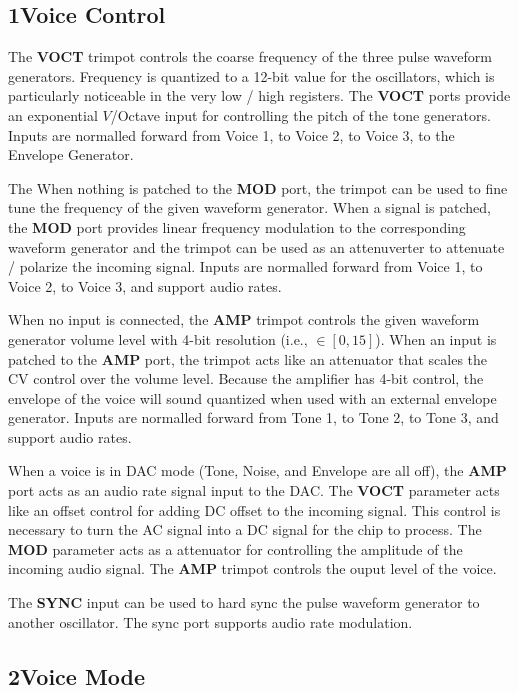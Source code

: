 \documentclass[12pt,letter]{article}
\begin{document}
\subsection*{1{\quad}Voice Control}

The \textbf{VOCT} trimpot controls the coarse frequency of the three pulse waveform generators. Frequency is quantized to a 12-bit value for the oscillators, which is particularly noticeable in the very low / high registers. The \textbf{VOCT} ports provide an exponential $V$/Octave input for controlling the pitch of the tone generators. Inputs are normalled forward from Voice 1, to Voice 2, to Voice 3, to the Envelope Generator.

The When nothing is patched to the \textbf{MOD} port, the trimpot can be used to fine tune the frequency of the given waveform generator. When a signal is patched, the \textbf{MOD} port provides linear frequency modulation to the corresponding waveform generator and the trimpot can be used as an attenuverter to attenuate / polarize the incoming signal. Inputs are normalled forward from Voice 1, to Voice 2, to Voice 3, and support audio rates.

When no input is connected, the \textbf{AMP} trimpot controls the given waveform generator volume level with 4-bit resolution (i.e., $\in [0, 15]$). When an input is patched to the \textbf{AMP} port, the trimpot acts like an attenuator that scales the CV control over the volume level. Because the amplifier has 4-bit control, the envelope of the voice will sound quantized when used with an external envelope generator. Inputs are normalled forward from Tone 1, to Tone 2, to Tone 3, and support audio rates.

When a voice is in DAC mode (Tone, Noise, and Envelope are all off), the \textbf{AMP} port acts as an audio rate signal input to the DAC. The \textbf{VOCT} parameter acts like an offset control for adding DC offset to the incoming signal. This control is necessary to turn the AC signal into a DC signal for the chip to process. The \textbf{MOD} parameter acts as a attenuator for controlling the amplitude of the incoming audio signal. The \textbf{AMP} trimpot controls the ouput level of the voice.

The \textbf{SYNC} input can be used to hard sync the pulse waveform generator to another oscillator. The sync port supports audio rate modulation.

\subsection*{2{\quad}Voice Mode}
\end{document}
